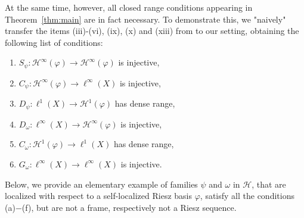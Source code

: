 \documentclass{amsart}
\def\Hil{\mathcal{H}}
\renewcommand{\H}{{\mathcal{H}}}
\begin{document}
At the same time, however, all closed range conditions appearing in Theorem~\ref{thm:main} are in fact necessary. To demonstrate this, we "naively" transfer the items (iii)-(vi), (ix), (x) and (xiii) from \cite[Theorem~3.1]{gro07ineq} to our setting, obtaining the following list of conditions:
%
\begin{enumerate} 
    \item[$(a)$] $S_\psi:\H^\infty(\varphi)\to \H^\infty(\varphi)$ is injective,
    \item[$(b)$] $C_\psi:\H^\infty(\varphi)\to \ell^\infty(X)$ is injective,
    \item[$(c)$] $D_\psi:\ell^1(X)\to \H^1(\varphi)$ has dense range,
    \item[$(d)$] $D_\omega:\ell^\infty(X)\to \H^\infty(\varphi)$ is injective,
    \item[$(e)$] $C_\omega:\H^1(\varphi)\to \ell^1(X)$ has dense range,
    \item[$(f)$] $G_\omega:\ell^\infty(X)\to\ell^\infty(X)$ is injective.
\end{enumerate} 
\noindent %
Below, we provide an elementary example of families $\psi$ and $\omega$ in $\Hil$, that are localized with respect to a self-localized Riesz basis $\varphi$, satisfy all the conditions (a)$-$(f), but are not a frame, respectively not a Riesz sequence. %
\end{document}
